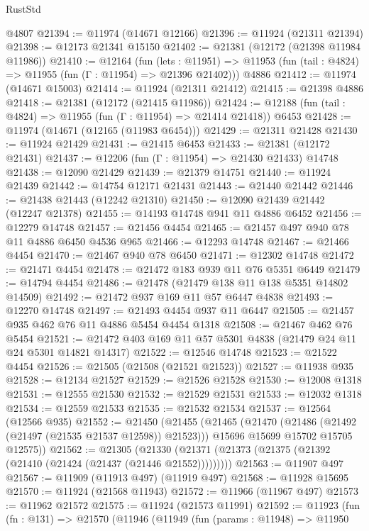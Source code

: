 \begin{lexlean}{RustStd}
\begin{coremodule}
    @4807
@21394 := @11974 (@14671 @12166)
@21396 := @11924 (@21311 @21394)
@21398 := @12173 @21341 @15150
@21402 := @21381 (@12172 (@21398 @11984 @11986))
@21410 := @12164
    (fun (lets : @11951) =>
    @11953 (fun (tail : @4824) => @11955 (fun (Γ : @11954) => @21396 @21402)))
    @4886
@21412 := @11974 (@14671 @15003)
@21414 := @11924 (@21311 @21412)
@21415 := @21398 @4886
@21418 := @21381 (@12172 (@21415 @11986))
@21424 := @12188 (fun (tail : @4824) => @11955 (fun (Γ : @11954) => @21414 @21418)) @6453
@21428 := @11974 (@14671 (@12165 (@11983 @6454)))
@21429 := @21311 @21428
@21430 := @11924 @21429
@21431 := @21415 @6453
@21433 := @21381 (@12172 @21431)
@21437 := @12206 (fun (Γ : @11954) => @21430 @21433) @14748
@21438 := @12090 @21429
@21439 := @21379 @14751
@21440 := @11924 @21439
@21442 := @14754 @12171 @21431
@21443 := @21440 @21442
@21446 := @21438 @21443 (@12242 @21310)
@21450 := @12090 @21439 @21442 (@12247 @21378)
@21455 := @14193 @14748 @941 @11 @4886 @6452
@21456 := @12279 @14748
@21457 := @21456 @4454
@21465 := @21457 @497 @940 @78 @11 @4886 @6450 @4536 @965
@21466 := @12293 @14748
@21467 := @21466 @4454
@21470 := @21467 @940 @78 @6450
@21471 := @12302 @14748
@21472 := @21471 @4454
@21478 := @21472 @183 @939 @11 @76 @5351 @6449
@21479 := @14794 @4454
@21486 := @21478 (@21479 @138 @11 @138 @5351 @14802 @14509)
@21492 := @21472 @937 @169 @11 @57 @6447 @4838
@21493 := @12270 @14748
@21497 := @21493 @4454 @937 @11 @6447
@21505 := @21457 @935 @462 @76 @11 @4886 @5454 @4454 @1318
@21508 := @21467 @462 @76 @5454
@21521 := @21472 @403 @169 @11 @57 @5301 @4838 (@21479 @24 @11 @24 @5301 @14821 @14317)
@21522 := @12546 @14748
@21523 := @21522 @4454
@21526 := @21505 (@21508 (@21521 @21523))
@21527 := @11938 @935
@21528 := @12134 @21527
@21529 := @21526 @21528
@21530 := @12008 @1318
@21531 := @12555 @21530
@21532 := @21529 @21531
@21533 := @12032 @1318
@21534 := @12559 @21533
@21535 := @21532 @21534
@21537 := @12564 (@12566 @935)
@21552 := @21450
    (@21455
      (@21465
        (@21470 (@21486 (@21492 (@21497 (@21535 @21537 @12598)) @21523)))
        @15696
        @15699
        @15702
        @15705
        @12575))
@21562 := @21305
    (@21330 (@21371 (@21373 (@21375 (@21392 (@21410 (@21424 (@21437 (@21446 @21552)))))))))
@21563 := @11907 @497
@21567 := @11909 (@11913 @497) (@11919 @497)
@21568 := @11928 @15695
@21570 := @11924 (@21568 @11943)
@21572 := @11966 (@11967 @497)
@21573 := @11962 @21572
@21575 := @11924 (@21573 @11991)
@21592 := @11923
    (fun (fn : @131) =>
    @21570
      (@11946
        (@11949
          (fun (params : @11948) =>
          @11950

\end{coremodule}
\end{lexlean}
